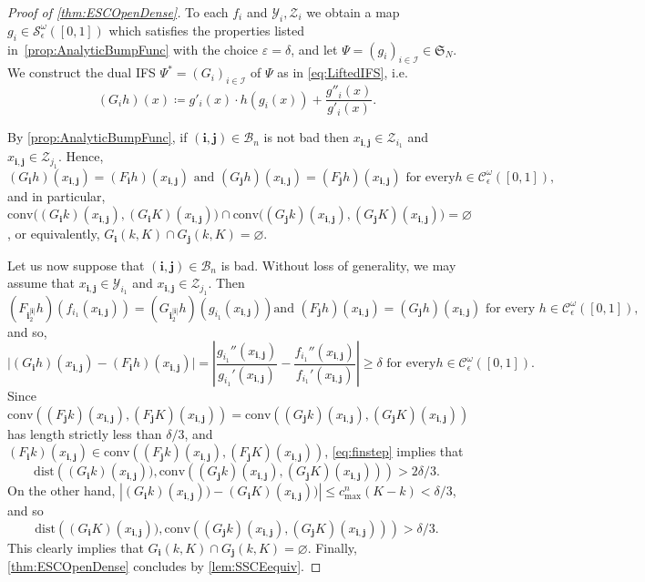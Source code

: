 \documentclass[11pt,a4paper]{article}
\def\cref#1{\ref{#1}}%
\theoremstyle{definition}
\theoremstyle{remark}
\newcommand{\0}{\mathbf{0}}
\newcommand{\bi}{\mathbf{i}}
\newcommand{\bj}{\mathbf{j}}
\numberwithin{equation}{section}
\begin{document}
\begin{proof}[Proof of \cref{thm:ESCOpenDense}]
To each $f_i$ and $\mathcal{Y}_i, \mathcal{Z}_i$ we obtain a map
$g_i\in\mathcal{S}_\epsilon^\omega([0,1])$ which satisfies the properties
listed in~\cref{prop:AnalyticBumpFunc} with the choice $\varepsilon=\delta$, and let
$\Psi=(g_i)_{i\in\mathcal{I}}\in\mathfrak{S}_N$. We construct the dual IFS
$\Psi^*=(G_i)_{i\in\mathcal{I}}$ of $\Psi$ as in \cref{eq:LiftedIFS}, i.e. 
\begin{equation*}
(G_ih)(x)\coloneqq g'_i(x)\cdot h(g_i(x)) + \frac{g''_i(x)}{g'_i(x)}.
\end{equation*}

By \cref{prop:AnalyticBumpFunc}, if $(\bi,\bj)\in\mathcal{B}_n$ is not bad then
$x_{\bi,\bj}\in\mathcal{Z}_{i_1}$ and $x_{\bi,\bj}\in\mathcal{Z}_{j_1}$. Hence,
\begin{equation*}
(G_{\bi}h)(x_{\bi,\bj})=(F_{\bi}h)(x_{\bi,\bj}) \text{ and }
(G_{\bj}h)(x_{\bi,\bj})=(F_{\bj}h)(x_{\bi,\bj})\text{ for every
}h\in\mathcal{C}_\epsilon^\omega([0,1]),
\end{equation*}
and in particular, $\mathrm{conv}\big((G_{\bi}k)(x_{\bi,\bj}), (G_{\bi}K)(x_{\bi,\bj})\big) \cap
\mathrm{conv}\big((G_{\bj}k)(x_{\bi,\bj}),
(G_{\bj}K)(x_{\bi,\bj})\big)=\varnothing$, or equivalently, $G_{\bi}(k,K)\cap G_{\bj}(k,K)=\varnothing$.

Let us now suppose that $(\bi,\bj)\in\mathcal{B}_n$ is bad. Without loss of generality, we may
assume that $x_{\bi,\bj}\in\mathcal{Y}_{i_1}$ and $x_{\bi,\bj}\in\mathcal{Z}_{j_1}$. Then
\begin{equation*}
	(F_{\bi_2^{|\bi|}}h)(f_{i_1}(x_{\bi,\bj}))=(G_{\bi_2^{|\bi|}}h)(g_{i_1}(x_{\bi,\bj})) \text{
	and } (F_{\bj}h)(x_{\bi,\bj})=(G_{\bj}h)(x_{\bi,\bj})\text{ for every
	}h\in\mathcal{C}_\epsilon^\omega([0,1]),
\end{equation*}
and so,
\begin{equation}\label{eq:finstep}
\big|(G_{\bi}h)(x_{\bi,\bj})-(F_{\bi}h)(x_{\bi,\bj})\big| = \left|
\frac{g_{i_1}''(x_{\bi,\bj})}{g_{i_1}'(x_{\bi,\bj})} -
\frac{f_{i_1}''(x_{\bi,\bj})}{f_{i_1}'(x_{\bi,\bj})} \right|\geq \delta\text{ for every
}h\in\mathcal{C}_\epsilon^\omega([0,1]).
\end{equation}
Since
$\mathrm{conv}\left((F_{\bj}k)(x_{\bi,\bj}),(F_{\bj}K)(x_{\bi,\bj})\right)=\mathrm{conv}\left((G_{\bj}k)(x_{\bi,\bj}),(G_{\bj}K)(x_{\bi,\bj})\right)$
has length strictly less than $\delta/3$, and
$(F_{\bi}k)(x_{\bi,\bj})\in\mathrm{conv}\left((F_{\bj}k)(x_{\bi,\bj}),(F_{\bj}K)(x_{\bi,\bj})\right)$,
\cref{eq:finstep} implies that 
$$
\mathrm{dist}\left((G_{\bi}k)(x_{\bi,\bj})),\mathrm{conv}\left((G_{\bj}k)(x_{\bi,\bj}),(G_{\bj}K)(x_{\bi,\bj})\right)\right)>2\delta/3. 
$$
On the other hand, $|(G_{\bi}k)(x_{\bi,\bj}))-(G_{\bi}K)(x_{\bi,\bj}))|\leq c_{\max}^n(K-k)<\delta/3$, and so 
$$
\mathrm{dist}\left((G_{\bi}K)(x_{\bi,\bj})),\mathrm{conv}\left((G_{\bj}k)(x_{\bi,\bj}),(G_{\bj}K)(x_{\bi,\bj})\right)\right)>\delta/3. 
$$
This clearly implies that  $G_{\bi}(k,K)\cap G_{\bj}(k,K)=\varnothing$. Finally, \cref{thm:ESCOpenDense} concludes by \cref{lem:SSCEequiv}.   
\end{proof}
\end{document}
